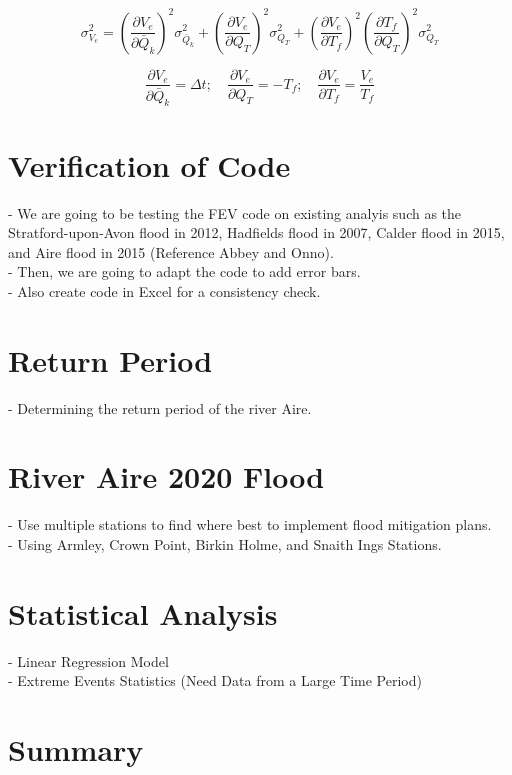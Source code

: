 \[{\sigma_{V_e}^2} = (\frac{\partial V_e}{\partial\bar Q_k})^2{\sigma_{\bar Q_k}^2} + (\frac{\partial V_e}{\partial Q_T})^2{\sigma_{Q_T}^2}+(\frac{\partial V_e}{\partial T_f})^2(\frac{\partial T_f}{\partial Q_T})^2{\sigma_{Q_T}^2}\]


\[\frac{\partial V_e}{\partial\bar Q_k} = \Delta t;\quad  \frac{\partial V_e}{\partial Q_T} = -T_f;\quad  \frac{\partial V_e}{\partial T_f} = \frac{V_e}{T_f}\]


\section*{Verification of Code}
- We are going to be testing the FEV code on existing analyis such as the Stratford-upon-Avon flood in 2012, Hadfields flood in 2007, Calder flood in 2015, and Aire flood in 2015 (Reference Abbey and Onno). \\
- Then, we are going to adapt the code to add error bars. \\
- Also create code in Excel for a consistency check. \\

\section*{Return Period}
- Determining the return period of the river Aire. \\

\section*{River Aire 2020 Flood}
- Use multiple stations to find where best to implement flood mitigation plans. \\
- Using Armley, Crown Point, Birkin Holme, and Snaith Ings Stations.

\section*{Statistical Analysis}
- Linear Regression Model \\
- Extreme Events Statistics (Need Data from a Large Time Period)

\section*{Summary}
